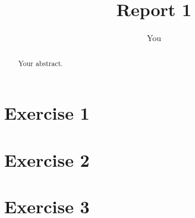\documentclass{article}
\title{Report 1}
\author{You}
\begin{document}
\maketitle

\begin{abstract}
Your abstract.
\end{abstract}

\section{Exercise 1}

\section{Exercise 2}

\section{Exercise 3}




\end{document}
